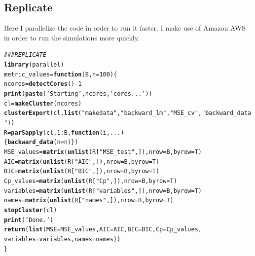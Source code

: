 \documentclass[11pt]{article}\usepackage[]{graphicx}\usepackage[]{color}
\makeatletter
\newcommand{\hlnum}[1]{\textcolor[rgb]{0.686,0.059,0.569}{#1}}%
\newcommand{\hlstr}[1]{\textcolor[rgb]{0.192,0.494,0.8}{#1}}%
\newcommand{\hlcom}[1]{\textcolor[rgb]{0.678,0.584,0.686}{\textit{#1}}}%
\newcommand{\hlopt}[1]{\textcolor[rgb]{0,0,0}{#1}}%
\newcommand{\hlstd}[1]{\textcolor[rgb]{0.345,0.345,0.345}{#1}}%
\newcommand{\hlkwa}[1]{\textcolor[rgb]{0.161,0.373,0.58}{\textbf{#1}}}%
\newcommand{\hlkwb}[1]{\textcolor[rgb]{0.69,0.353,0.396}{#1}}%
\newcommand{\hlkwc}[1]{\textcolor[rgb]{0.333,0.667,0.333}{#1}}%
\newcommand{\hlkwd}[1]{\textcolor[rgb]{0.737,0.353,0.396}{\textbf{#1}}}%
\newenvironment{kframe}{%
 \def\at@end@of@kframe{}%
 \ifinner\ifhmode%
  \def\at@end@of@kframe{\end{minipage}}%
  \begin{minipage}{\columnwidth}%
 \fi\fi%
 \def\FrameCommand##1{\hskip\@totalleftmargin \hskip-\fboxsep
 \colorbox{shadecolor}{##1}\hskip-\fboxsep
     \hskip-\linewidth \hskip-\@totalleftmargin \hskip\columnwidth}%
 \MakeFramed {\advance\hsize-\width
   \@totalleftmargin\z@ \linewidth\hsize
   \@setminipage}}%
 {\par\unskip\endMakeFramed%
 \at@end@of@kframe}
\newenvironment{knitrout}{}{} %
\makeatother
\begin{document}
\subsection{Replicate}
Here I parallelize the code in order to run it faster. I make use of Amazon AWS in order to run the simulations more quickly.
\begin{knitrout}
\color{fgcolor}\begin{kframe}
\begin{alltt}
\hlcom{## # REPLICATE}
\hlkwd{library}\hlstd{(parallel)}
\hlstd{metric_values} \hlkwb{=} \hlkwa{function}\hlstd{(}\hlkwc{B}\hlstd{,}\hlkwc{n}\hlstd{=}\hlnum{100}\hlstd{)\{}
  \hlstd{ncores} \hlkwb{=} \hlkwd{detectCores}\hlstd{()}\hlopt{-}\hlnum{1}
  \hlkwd{print}\hlstd{(}\hlkwd{paste}\hlstd{(}\hlstr{'Starting '}\hlstd{, ncores,} \hlstr{' cores...'}\hlstd{))}
  \hlstd{cl} \hlkwb{=} \hlkwd{makeCluster}\hlstd{(ncores)}
  \hlkwd{clusterExport}\hlstd{(cl,}\hlkwd{list}\hlstd{(}\hlstr{"makedata"}\hlstd{,} \hlstr{"backward_lm"}\hlstd{,} \hlstr{"MSE_cv"}\hlstd{,}\hlstr{"backward_data"}\hlstd{))}
  \hlstd{R} \hlkwb{=} \hlkwd{parSapply}\hlstd{(cl,} \hlnum{1}\hlopt{:}\hlstd{B,} \hlkwa{function}\hlstd{(}\hlkwc{i}\hlstd{,}\hlkwc{...}\hlstd{)}
    \hlstd{\{} \hlkwd{backward_data}\hlstd{(}\hlkwc{n}\hlstd{=n) \} )}
  \hlstd{MSE_values} \hlkwb{=} \hlkwd{matrix}\hlstd{(}\hlkwd{unlist}\hlstd{(R[}\hlstr{"MSE_test"}\hlstd{,]),} \hlkwc{nrow} \hlstd{= B,} \hlkwc{byrow} \hlstd{= T)}
  \hlstd{AIC} \hlkwb{=} \hlkwd{matrix}\hlstd{(}\hlkwd{unlist}\hlstd{(R[}\hlstr{"AIC"}\hlstd{,]),} \hlkwc{nrow} \hlstd{= B,} \hlkwc{byrow} \hlstd{= T)}
  \hlstd{BIC} \hlkwb{=} \hlkwd{matrix}\hlstd{(}\hlkwd{unlist}\hlstd{(R[}\hlstr{"BIC"}\hlstd{,]),} \hlkwc{nrow} \hlstd{= B,} \hlkwc{byrow} \hlstd{= T)}
  \hlstd{Cp_values}  \hlkwb{=} \hlkwd{matrix}\hlstd{(}\hlkwd{unlist}\hlstd{(R[}\hlstr{"Cp"}\hlstd{,]),} \hlkwc{nrow} \hlstd{= B,} \hlkwc{byrow} \hlstd{= T)}
  \hlstd{variables} \hlkwb{=} \hlkwd{matrix}\hlstd{(}\hlkwd{unlist}\hlstd{(R[}\hlstr{"variables"}\hlstd{,]),} \hlkwc{nrow} \hlstd{= B,} \hlkwc{byrow} \hlstd{= T)}
  \hlstd{names} \hlkwb{=} \hlkwd{matrix}\hlstd{(}\hlkwd{unlist}\hlstd{(R[}\hlstr{"names"}\hlstd{,]),} \hlkwc{nrow} \hlstd{= B,} \hlkwc{byrow} \hlstd{= T)}
  \hlkwd{stopCluster}\hlstd{(cl)}
  \hlkwd{print}\hlstd{(}\hlstr{'Done.'}\hlstd{)}
  \hlkwd{return}\hlstd{(}\hlkwd{list}\hlstd{(}\hlkwc{MSE}\hlstd{=MSE_values,} \hlkwc{AIC}\hlstd{=AIC,} \hlkwc{BIC}\hlstd{=BIC,} \hlkwc{Cp}\hlstd{=Cp_values,}
              \hlkwc{variables}\hlstd{=variables,} \hlkwc{names}\hlstd{=names))}
\hlstd{\}}


\end{alltt}
\end{kframe}
\end{knitrout}
\end{document}
